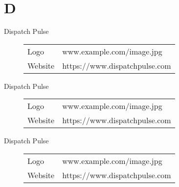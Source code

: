 \documentclass{article}
\begin{document}
	\section*{D}
	\begin{description}
		\item [Dispatch Pulse] 
		
		\begin{tabular}{ l l }
			Logo & www.example.com/image.jpg \\ 
			Website & https://www.dispatchpulse.com \\  
		\end{tabular}
	    \filbreak
		\item [Dispatch Pulse] 
		
		\begin{tabular}{ l l }
			Logo & www.example.com/image.jpg \\ 
			Website & https://www.dispatchpulse.com \\  
		\end{tabular}
		\filbreak
		\item [Dispatch Pulse] 
		
		\begin{tabular}{ l l }
			Logo & www.example.com/image.jpg \\ 
			Website & https://www.dispatchpulse.com \\  
		\end{tabular}
		\filbreak
	\end{description}
\end{document}
